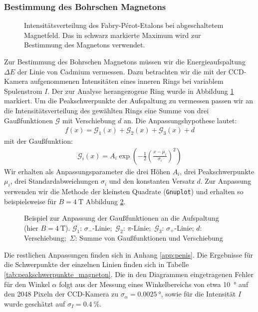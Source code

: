 \documentclass[11pt, a4paper]{article}
\begin{document}
\FloatBarrier
\subsubsection{Bestimmung des Bohrschen Magnetons}
\label{sssec:magneton}
\begin{figure}[h]
	\centering
	
	\caption{Intensitätsverteilung des Fabry-Pérot-Etalons bei abgeschaltetem Magnetfeld. Das in schwarz markierte Maximum wird zur Bestimmung des Magnetons verwendet.}
	\label{fig:peakauswahl}
\end{figure}
Zur Bestimmung des Bohrschen Magnetons müssen wir die Energieaufspaltung $\Delta E$ der Linie von Cadmium vermessen.
Dazu betrachten wir die mit der CCD-Kamera aufgenommenen Intensitäten eines inneren Rings bei variablem Spulenstrom $I$.
Der zur Analyse herangezogene Ring wurde in Abbildung \ref{fig:peakauswahl} markiert.
Um die Peakschwerpunkte der Aufspaltung zu vermessen passen wir an die Intensitätsverteilung des gewählten Rings eine Summe von drei Gaußfunktionen $\mathcal{G}$ mit Verschiebung $d$ an.
Die Anpassungshypothese lautet:
\begin{align}
f(x) = \mathcal{G}_1(x) + \mathcal{G}_2(x) + \mathcal{G}_3(x) + d
\end{align}
mit der Gaußfunktion:
\begin{align}
\mathcal{G}_i(x) = A_i \exp\left( -\frac{1}{2} \left( \frac{x - \mu_i}{\sigma_i} \right)^2 \right)
\end{align}
Wir erhalten als Anpassungsparameter die drei Höhen $A_i$, drei Peakschwerpunkte $\mu_i$, drei Standardabweichungen $\sigma_i$ und den konstanten Versatz $d$.
Zur Anpassung verwenden wir die Methode der kleinsten Quadrate (\texttt{Gnuplot}) und erhalten so beispielsweise für $B = \SI{4}{\tesla}$ Abbildung \ref{fig:zeeman_b4_bsp}.
\begin{figure}[h]
	\centering
	
	\caption{Beispiel zur Anpassung der Gaußfunktionen an die Aufspaltung (hier $B = \SI{4}{\tesla}$). $\mathcal{G}_1$: $\sigma_-$-Linie;\, $\mathcal{G}_2$: $\pi$-Linie;\, $\mathcal{G}_3$: $\sigma_+$-Linie; $d$: Verschiebung;\, $\Sigma$: Summe von Gaußfunktionen und Verschiebung}
	\label{fig:zeeman_b4_bsp}
\end{figure}
Die restlichen Anpassungen finden sich in Anhang \ref{app:penis}.
Die Ergebnisse für die Schwerpunkte der einzelnen Linien finden sich in Tabelle \ref{tab:peakschwerpunkte_magneton}.
Die in den Diagrammen eingetragenen Fehler für den Winkel $\alpha$ folgt aus der Messung eines Winkelbereichs von etwa \SI{10}{\degree} auf den \num{2048} Pixeln der CCD-Kamera zu $\sigma_\alpha = \SI{0.0025}{\degree}$, sowie für die Intensität $I$ wurde geschätzt auf $\sigma_I = \SI{0.4}{\percent}$.
\end{document}
